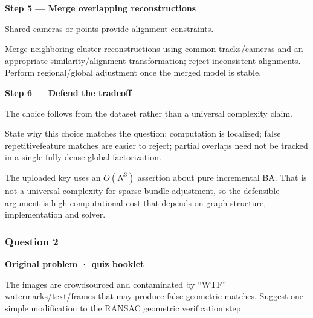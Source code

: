 \documentclass[letterpaper,11pt,english,openany,oneside]{jupyterBook}
\begin{document}
\par

\par\medskip{}
{\color{QuizStepRed}\bfseries Step 5 — Merge overlapping reconstructions}\par\smallskip

\sphinxAtStartPar
{} Shared cameras or points provide alignment constraints.

\sphinxAtStartPar
Merge neighboring cluster reconstructions using common tracks/cameras and an appropriate similarity/alignment transformation; reject inconsistent alignments. Perform regional/global adjustment once the merged model is stable.

\par

\par\medskip{}
{\color{QuizStepRed}\bfseries Step 6 — Defend the tradeoff}\par\smallskip

\sphinxAtStartPar
{} The choice follows from the dataset rather than a universal complexity claim.

\sphinxAtStartPar
State why this choice matches the question: computation is localized; false repetitive\sphinxhyphen{}feature matches are easier to reject; partial overlaps need not be tracked in a single fully dense global factorization.

\par

\sphinxAtStartPar
{} The uploaded key uses an \(O(N^3)\) assertion about pure incremental BA. That is not a universal complexity for sparse bundle adjustment, so the defensible argument is high computational cost that depends on graph structure, implementation and solver.


\subsubsection{Question 2}
\label{\detokenize{lectures/lecture06/quiz-workbook:quiz-16-q2}}\label{\detokenize{lectures/lecture06/quiz-workbook:id1}}
\par\medskip\textbf{Original problem · quiz booklet}\par\smallskip

\sphinxAtStartPar
The images are crowd\sphinxhyphen{}sourced and contaminated by “WTF” watermarks/text/frames that may produce false geometric matches. Suggest one simple modification to the RANSAC geometric verification step.
\end{document}

